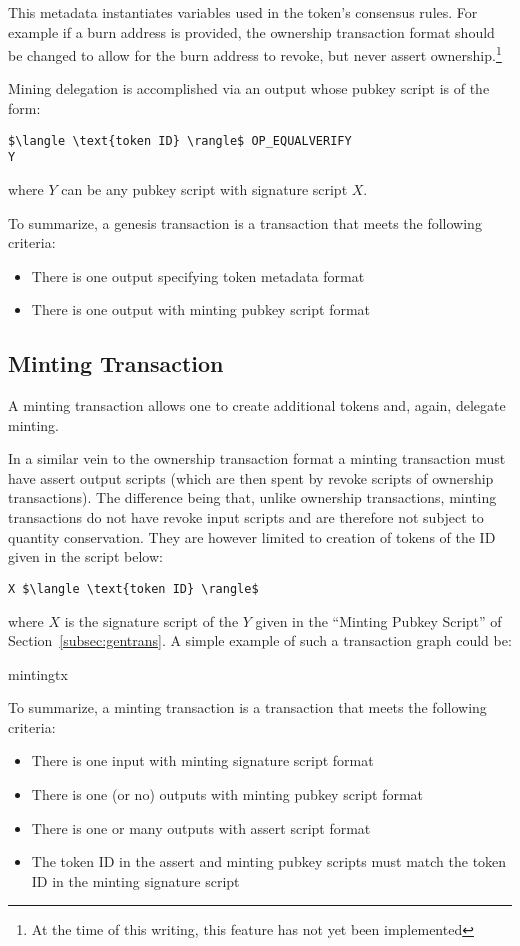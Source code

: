 \documentclass[9pt,oneside]{amsart}
\begin{document}
\begin{multicols}{2}
This metadata instantiates variables used in the token's consensus rules. For example if a burn address is provided, the ownership transaction format should be changed to allow for the burn address to revoke, but never assert ownership.\footnote{At the time of this writing, this feature has not yet been implemented}

Mining delegation is accomplished via an output whose pubkey script is of the form:

\begin{lstlisting}[title={\textbf{Minting PubKey Script}}]
$\langle \text{token ID} \rangle$ OP_EQUALVERIFY
Y
\end{lstlisting}
where $Y$ can be any pubkey script with signature script $X$. 

To summarize, a genesis transaction is a transaction that meets the following criteria:
\begin{itemize}
    \item There is one output specifying token metadata format
    \item There is one output with minting pubkey script format
\end{itemize}

\subsection{Minting Transaction}
A minting transaction allows one to create additional tokens and, again, delegate minting.

In a similar vein to the ownership transaction format a minting transaction must have assert output scripts (which are then spent by revoke scripts of ownership transactions). The difference being that, unlike ownership transactions, minting transactions do not have revoke input scripts and are therefore not subject to quantity conservation. They are however limited to creation of tokens of the ID given in the script below:

\begin{lstlisting}[title={\textbf{Minting Signature Script}}]
X $\langle \text{token ID} \rangle$
\end{lstlisting}
where $X$ is the signature script of the $Y$ given in the ``Minting Pubkey Script'' of Section~\ref{subsec:gentrans}. A simple example of such a transaction graph could be: 
\begin{center}
{mintingtx}
\end{center}

To summarize, a minting transaction is a transaction that meets the following criteria:
\begin{itemize}
    \item There is one input with minting signature script format
    \item There is one (or no) outputs with minting pubkey script format
    \item There is one or many outputs with assert script format
    \item The token ID in the assert and minting pubkey scripts must match the token ID in the minting signature script
\end{itemize}


\end{multicols}
\end{document}
